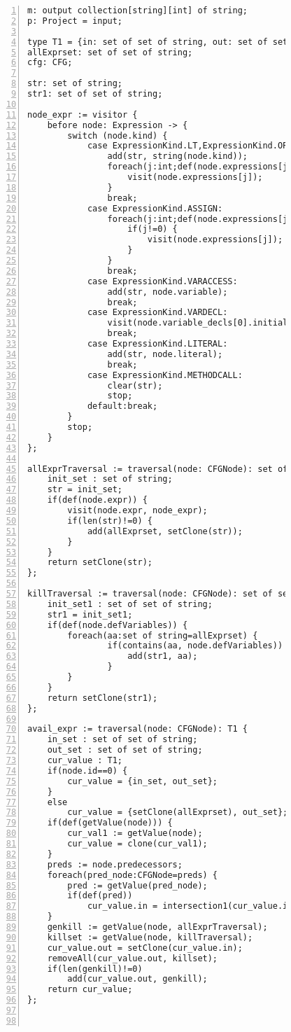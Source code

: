 \begin{figure}[ht!]
\begin{lstlisting}[numbers=left, tabsize=4, escapechar=@, caption={Available expression analysis},label={lst:ae-code},lastline=45] 
m: output collection[string][int] of string;
p: Project = input;

type T1 = {in: set of set of string, out: set of set of string};
allExprset: set of set of string;
cfg: CFG;

str: set of string;
str1: set of set of string;

node_expr := visitor {
	before node: Expression -> {
		switch (node.kind) {
			case ExpressionKind.LT,ExpressionKind.OP_ADD, ExpressionKind.OP_SUB, ExpressionKind.OP_INC, ExpressionKind.OP_MULT, ExpressionKind.OP_DIV, ExpressionKind.OP_MOD, ExpressionKind.OP_DEC, ExpressionKind.GT, ExpressionKind.EQ, ExpressionKind.NEQ, ExpressionKind.LTEQ, ExpressionKind.GTEQ, ExpressionKind.LOGICAL_NOT, ExpressionKind.LOGICAL_AND, ExpressionKind.LOGICAL_OR, ExpressionKind.BIT_AND, ExpressionKind.BIT_OR, ExpressionKind.BIT_NOT, ExpressionKind.BIT_XOR, ExpressionKind.BIT_LSHIFT, ExpressionKind.BIT_RSHIFT, ExpressionKind.BIT_UNSIGNEDRSHIFT:
				add(str, string(node.kind)); 
				foreach(j:int;def(node.expressions[j])) {
					visit(node.expressions[j]);
				}
				break;
			case ExpressionKind.ASSIGN:
				foreach(j:int;def(node.expressions[j])) {
					if(j!=0) {
						visit(node.expressions[j]);
					}
				}
				break;
			case ExpressionKind.VARACCESS:
				add(str, node.variable);
				break;
			case ExpressionKind.VARDECL:
				visit(node.variable_decls[0].initializer);
				break;
			case ExpressionKind.LITERAL:
				add(str, node.literal);
				break;
			case ExpressionKind.METHODCALL:
				clear(str);
				stop;
			default:break;
		}
		stop;
	}
};

allExprTraversal := traversal(node: CFGNode): set of string {
	init_set : set of string;
	str = init_set;
	if(def(node.expr)) {
		visit(node.expr, node_expr);
		if(len(str)!=0) {
			add(allExprset, setClone(str));
		}
	}
	return setClone(str);
};

killTraversal := traversal(node: CFGNode): set of set of string {
	init_set1 : set of set of string;
	str1 = init_set1;
	if(def(node.defVariables)) {
		foreach(aa:set of string=allExprset) {
				if(contains(aa, node.defVariables)) {
					add(str1, aa);
				}
		}
	}
	return setClone(str1);
};

avail_expr := traversal(node: CFGNode): T1 {
	in_set : set of set of string;
	out_set : set of set of string;
	cur_value : T1;
	if(node.id==0) {
		cur_value = {in_set, out_set};
	}
	else
		cur_value = {setClone(allExprset), out_set};
	if(def(getValue(node))) {
		cur_val1 := getValue(node);
		cur_value = clone(cur_val1);
	}
	preds := node.predecessors;
	foreach(pred_node:CFGNode=preds) {	
		pred := getValue(pred_node);
		if(def(pred))
			cur_value.in = intersection1(cur_value.in, pred.out);
	}
	genkill := getValue(node, allExprTraversal);
	killset := getValue(node, killTraversal);
	cur_value.out = setClone(cur_value.in);
	removeAll(cur_value.out, killset);
	if(len(genkill)!=0)
		add(cur_value.out, genkill);
	return cur_value;
};



\end{lstlisting}
\end{figure}
